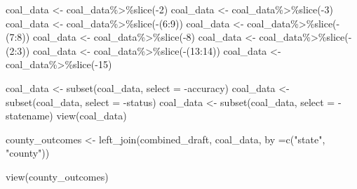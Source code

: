 \documentclass[
]{article}
\newenvironment{Shaded}{\begin{snugshade}}{\end{snugshade}}
\newcommand{\AttributeTok}[1]{\textcolor[rgb]{0.77,0.63,0.00}{#1}}
\newcommand{\DecValTok}[1]{\textcolor[rgb]{0.00,0.00,0.81}{#1}}
\newcommand{\FunctionTok}[1]{\textcolor[rgb]{0.00,0.00,0.00}{#1}}
\newcommand{\NormalTok}[1]{#1}
\newcommand{\OtherTok}[1]{\textcolor[rgb]{0.56,0.35,0.01}{#1}}
\newcommand{\SpecialCharTok}[1]{\textcolor[rgb]{0.00,0.00,0.00}{#1}}
\newcommand{\StringTok}[1]{\textcolor[rgb]{0.31,0.60,0.02}{#1}}
\begin{document}
\begin{Shaded}
\begin{Highlighting}[]
\NormalTok{coal\_data }\OtherTok{\textless{}{-}}\NormalTok{ coal\_data}\SpecialCharTok{\%\textgreater{}\%}\FunctionTok{slice}\NormalTok{(}\SpecialCharTok{{-}}\DecValTok{2}\NormalTok{)}
\NormalTok{coal\_data }\OtherTok{\textless{}{-}}\NormalTok{ coal\_data}\SpecialCharTok{\%\textgreater{}\%}\FunctionTok{slice}\NormalTok{(}\SpecialCharTok{{-}}\DecValTok{3}\NormalTok{)}
\NormalTok{coal\_data }\OtherTok{\textless{}{-}}\NormalTok{ coal\_data}\SpecialCharTok{\%\textgreater{}\%}\FunctionTok{slice}\NormalTok{(}\SpecialCharTok{{-}}\NormalTok{(}\DecValTok{6}\SpecialCharTok{:}\DecValTok{9}\NormalTok{))}
\NormalTok{coal\_data }\OtherTok{\textless{}{-}}\NormalTok{ coal\_data}\SpecialCharTok{\%\textgreater{}\%}\FunctionTok{slice}\NormalTok{(}\SpecialCharTok{{-}}\NormalTok{(}\DecValTok{7}\SpecialCharTok{:}\DecValTok{8}\NormalTok{))}
\NormalTok{coal\_data }\OtherTok{\textless{}{-}}\NormalTok{ coal\_data}\SpecialCharTok{\%\textgreater{}\%}\FunctionTok{slice}\NormalTok{(}\SpecialCharTok{{-}}\DecValTok{8}\NormalTok{)}
\NormalTok{coal\_data }\OtherTok{\textless{}{-}}\NormalTok{ coal\_data}\SpecialCharTok{\%\textgreater{}\%}\FunctionTok{slice}\NormalTok{(}\SpecialCharTok{{-}}\NormalTok{(}\DecValTok{2}\SpecialCharTok{:}\DecValTok{3}\NormalTok{))}
\NormalTok{coal\_data }\OtherTok{\textless{}{-}}\NormalTok{ coal\_data}\SpecialCharTok{\%\textgreater{}\%}\FunctionTok{slice}\NormalTok{(}\SpecialCharTok{{-}}\NormalTok{(}\DecValTok{13}\SpecialCharTok{:}\DecValTok{14}\NormalTok{))}
\NormalTok{coal\_data }\OtherTok{\textless{}{-}}\NormalTok{ coal\_data}\SpecialCharTok{\%\textgreater{}\%}\FunctionTok{slice}\NormalTok{(}\SpecialCharTok{{-}}\DecValTok{15}\NormalTok{)}

\NormalTok{coal\_data }\OtherTok{\textless{}{-}} \FunctionTok{subset}\NormalTok{(coal\_data, }\AttributeTok{select =} \SpecialCharTok{{-}}\NormalTok{accuracy)}
\NormalTok{coal\_data }\OtherTok{\textless{}{-}} \FunctionTok{subset}\NormalTok{(coal\_data, }\AttributeTok{select =} \SpecialCharTok{{-}}\NormalTok{status)}
\NormalTok{coal\_data }\OtherTok{\textless{}{-}} \FunctionTok{subset}\NormalTok{(coal\_data, }\AttributeTok{select =} \SpecialCharTok{{-}}\NormalTok{statename)}
\FunctionTok{view}\NormalTok{(coal\_data)}
\end{Highlighting}
\end{Shaded}

\begin{Shaded}
\begin{Highlighting}[]
\NormalTok{county\_outcomes }\OtherTok{\textless{}{-}} \FunctionTok{left\_join}\NormalTok{(combined\_draft, coal\_data, }\AttributeTok{by =}\FunctionTok{c}\NormalTok{(}\StringTok{"state"}\NormalTok{, }\StringTok{"county"}\NormalTok{))}

\FunctionTok{view}\NormalTok{(county\_outcomes)}
\end{Highlighting}
\end{Shaded}
\end{document}
